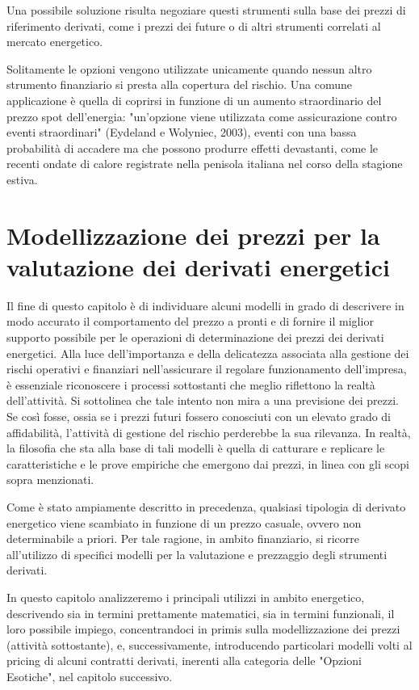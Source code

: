 \documentclass[12pt,a4paper]{report}
\begin{document}
Una possibile soluzione risulta negoziare questi strumenti sulla base dei prezzi di riferimento derivati, come i prezzi dei future o di altri strumenti correlati al mercato energetico.


Solitamente le opzioni vengono utilizzate unicamente quando nessun altro strumento finanziario si presta alla copertura del rischio. Una comune applicazione è quella di coprirsi in funzione di un aumento straordinario del prezzo spot dell'energia: "un'opzione viene utilizzata come assicurazione contro eventi straordinari" (Eydeland e Wolyniec, 2003), eventi con una bassa probabilità di accadere ma che possono produrre effetti devastanti, come le recenti ondate di calore registrate nella penisola italiana nel corso della stagione estiva. 


\chapter{Modellizzazione dei prezzi per la valutazione dei derivati energetici}

Il fine di questo capitolo è di individuare alcuni modelli in grado di descrivere in modo accurato il comportamento del prezzo a pronti e di fornire il miglior supporto possibile per le operazioni di determinazione dei prezzi dei derivati energetici. Alla luce dell'importanza e della delicatezza associata alla gestione dei rischi operativi e finanziari nell'assicurare il regolare funzionamento dell'impresa, è essenziale riconoscere i processi sottostanti che meglio riflettono la realtà dell'attività.
Si sottolinea che tale intento non mira a una previsione dei prezzi. Se così fosse, ossia se i prezzi futuri fossero conosciuti con un elevato grado di affidabilità, l'attività di gestione del rischio perderebbe la sua rilevanza. In realtà, la filosofia che sta alla base di tali modelli è quella di catturare e replicare le caratteristiche e le prove empiriche che emergono dai prezzi, in linea con gli scopi sopra menzionati.

Come è stato ampiamente descritto in precedenza, qualsiasi tipologia di derivato energetico viene scambiato in funzione di un prezzo casuale, ovvero non determinabile a priori. Per tale ragione, in ambito finanziario, si ricorre all'utilizzo di specifici modelli per la valutazione e prezzaggio degli strumenti derivati.

In questo capitolo analizzeremo i principali utilizzi in ambito energetico, descrivendo sia in termini prettamente matematici, sia in termini funzionali, il loro possibile impiego, concentrandoci in primis sulla modellizzazione dei prezzi (attività sottostante), e, successivamente, introducendo particolari modelli volti al pricing di alcuni contratti derivati, inerenti alla categoria delle "Opzioni Esotiche", nel capitolo successivo.
\end{document}
